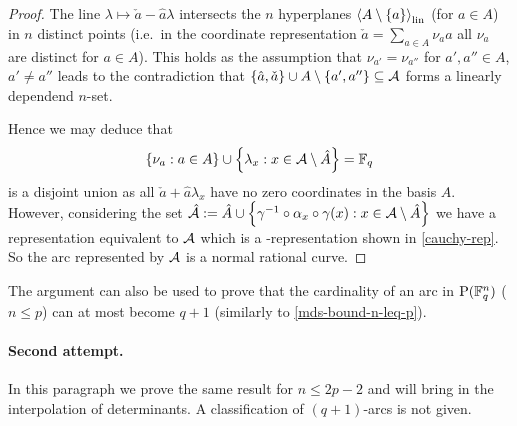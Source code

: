 \begin{proof}
    The line $\lambda\mapsto \check a-\hat a\lambda$ intersects the $n$ hyperplanes $\gen{A\setminus\set a}_{\lin}$ (for $a\in A$) in $n$ distinct points (i.e.~in the coordinate representation $\check a =\sum_{a\in A}{\nu_a a}$ all $\nu_a$ are distinct for $a\in A$). This holds as the assumption that $\nu_{a'}=\nu_{a''}$ for $a',a''\in A$, $a'\neq a''$ leads to the contradiction that $\set{\hat a,\check a}\setjoin A\setminus\set{a',a''}\setleq \cA$ forms a linearly dependend $n$-set.

    Hence we may deduce that
    $$
    \set{\nu_a:a\in A}\setjoin\set{\lambda_x:x\in \cA\setminus\hat A}=\field{q}
    $$ is a disjoint union as all $\check a+\hat a\lambda_x$ have no zero coordinates in the basis $A$. However, considering the set $\hat\cA:=\hat A\setjoin\set{\gamma^{-1}\compose\alpha_x\compose\gamma(x):x\in \cA\setminus\hat A}$ we have a representation equivalent to $\mathcal{A}$ which is a -representation shown in \autoref{cauchy-rep}. So the arc represented by $\mathcal{A}$ is a normal rational curve.
\end{proof}

\begin{remark}
    The argument can also be used to prove that the cardinality of an arc in $\P(\field{q}^n)$ ($n\leq p$) can at most become $q+1$ (similarly to \autoref{mds-bound-n-leq-p}).
\end{remark}

\paragraph{Second attempt.} In this paragraph we prove the same result for $n\leq 2p-2$ and will bring in the interpolation of determinants. A classification of $(q+1)$-arcs is not given.

